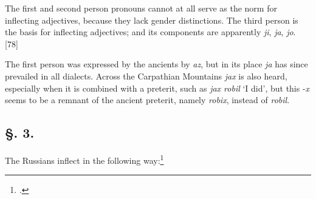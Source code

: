 The first and second person pronouns cannot at all serve as the norm for inflecting adjectives, because they lack gender distinctions. The third person is the basis for inflecting adjectives; and its components are apparently \textit{ji}, \textit{ja}, \textit{jo}. [78]

The first person was expressed by the ancients by \textit{az}, but in its place \textit{ja} has since prevailed in all dialects. Across the Carpathian Mountains \textit{jax} is also heard, especially when it is combined with a preterit, such as \textit{jax robil} ‘I did’, but this -\textit{x} seems to be a remnant of the ancient preterit, namely \textit{robix}, instead of \textit{robil}.

\subsection*{\hspace*{\fill}§. 3.\hspace*{\fill}}

The Russians inflect in the following way:\footnote{\citet[227--228]{puchmayer_lehrgebaude_1820}.}

